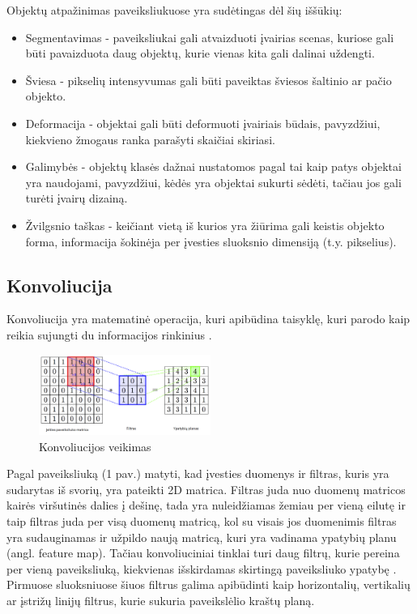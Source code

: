 \documentclass{VUMIFPSkursinis}
\begin{document}
Objektų atpažinimas paveiksliukuose yra sudėtingas dėl šių iššūkių:
\begin{itemize}
\item Segmentavimas - paveiksliukai gali atvaizduoti įvairias scenas, kuriose gali būti pavaizduota daug objektų, kurie vienas kita gali dalinai uždengti.
\item Šviesa - pikselių intensyvumas gali būti paveiktas šviesos šaltinio ar pačio objekto.
\item Deformacija - objektai gali būti deformuoti įvairiais būdais, pavyzdžiui, kiekvieno žmogaus ranka parašyti skaičiai skiriasi.
\item Galimybės - objektų klasės dažnai nustatomos pagal tai kaip patys objektai yra naudojami, pavyzdžiui, kėdės yra objektai sukurti sėdėti, tačiau jos gali turėti įvairų dizainą.
\item Žvilgsnio taškas - keičiant vietą iš kurios yra žiūrima gali keistis objekto forma, informacija šokinėja per įvesties sluoksnio dimensiją (t.y. pikselius). 
\end{itemize}

\subsection{Konvoliucija}
Konvoliucija yra matematinė operacija, kuri apibūdina taisyklę, kuri parodo kaip reikia sujungti du informacijos rinkinius \cite{Convolution-book}. 

\begin{figure}[h]
\centering
\includegraphics[width=0.5\textwidth]{img/Konvoliucija.png}
\caption{Konvoliucijos veikimas}
\end{figure}

Pagal paveiksliuką (1 pav.) matyti, kad įvesties duomenys ir filtras, kuris yra sudarytas iš svorių, yra pateikti 2D matrica. Filtras juda nuo duomenų matricos kairės viršutinės dalies į dešinę, 
tada yra nuleidžiamas žemiau per vieną eilutę ir taip filtras juda per visą duomenų matricą, kol su visais jos duomenimis filtras yra sudauginamas ir užpildo naują matricą, kuri 
yra vadinama ypatybių planu (angl. feature map).
Tačiau konvoliuciniai tinklai turi daug filtrų, kurie pereina per vieną paveiksliuką, kiekvienas išskirdamas skirtingą paveiksliuko ypatybę \cite{DBLP:journals/corr/abs-1708-08711}.
Pirmuose sluoksniuose šiuos filtrus galima apibūdinti kaip horizontalių, vertikalių ar įstrižų linijų filtrus, kurie sukuria paveikslėlio 
kraštų planą.
\end{document}

